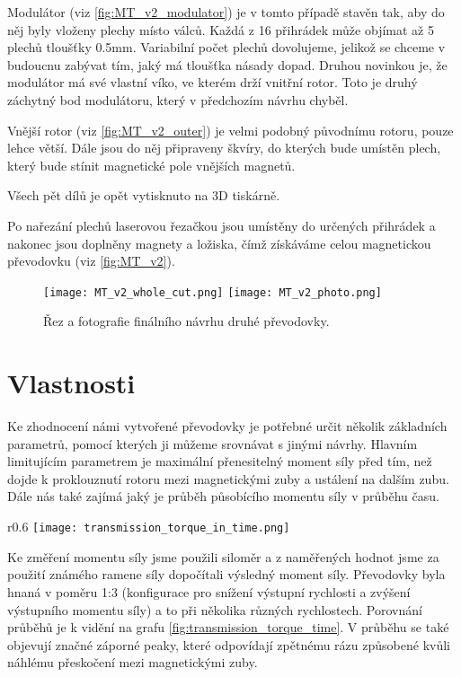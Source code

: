 Modulátor (viz \autoref{fig:MT_v2_modulator}) je v tomto případě stavěn tak, aby do něj byly vloženy plechy místo válců. Každá z 16 přihrádek může objímat až 5 plechů tloušťky 0.5mm. Variabilní počet plechů dovolujeme, jelikož se chceme v budoucnu zabývat tím, jaký má tloušťka násady dopad. Druhou novinkou je, že modulátor má své vlastní víko, ve kterém drží vnitřní rotor. Toto je druhý záchytný bod modulátoru, který v předchozím návrhu chyběl.

Vnější rotor (viz \autoref{fig:MT_v2_outer}) je velmi podobný původnímu rotoru, pouze lehce větší. Dále jsou do něj připraveny škvíry, do kterých bude umístěn plech, který bude stínit magnetické pole vnějších magnetů.

\clearpage
{
    Všech pět dílů je opět vytisknuto na 3D tiskárně. 
    \raggedright
    Po nařezání plechů laserovou řezačkou jsou umístěny do určených přihrádek a nakonec jsou doplněny magnety a ložiska, čímž získáváme celou magnetickou převodovku (viz \autoref{fig:MT_v2}).
}

\begin{figure}[H]
    \texttt{[image: MT\_v2\_whole\_cut.png]}
    \texttt{[image: MT\_v2\_photo.png]}
    \centering
    \caption{Řez a fotografie finálního návrhu druhé převodovky.}
    \label{fig:MT_v2}
\end{figure}

\section{Vlastnosti}

Ke zhodnocení námi vytvořené převodovky je potřebné určit několik základních parametrů, pomocí kterých ji můžeme srovnávat s jinými návrhy. Hlavním limitujícím parametrem je maximální přenesitelný moment síly před tím, než dojde k proklouznutí rotoru mezi magnetickými zuby a ustálení na dalším zubu. Dále nás také zajímá jaký je průběh působícího momentu síly v průběhu času.

\begin{wrapfigure}{r}{0.6\textwidth}
    \vspace{-1cm}
    \texttt{[image: transmission\_torque\_in\_time.png]}
    \caption{Průběh momentu síly v čase při různých úhlových rychlostech u převodovky v konfiguraci 1:3}
    \label{fig:transmission_torque_time}
\end{wrapfigure}

Ke změření momentu síly jsme použili siloměr a z naměřených hodnot jsme za použití známého ramene síly dopočítali výsledný moment síly. Převodovky byla hnaná v poměru 1:3 (konfigurace pro snížení výstupní rychlosti a zvýšení výstupního momentu síly) a to při několika různých rychlostech. Porovnání průběhů je k vidění na grafu \ref{fig:transmission_torque_time}. V průběhu se také objevují značné záporné peaky, které odpovídají zpětnému rázu způsobené kvůli náhlému přeskočení mezi magnetickými zuby.

